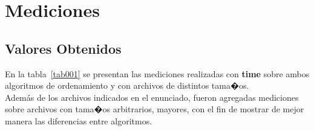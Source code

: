 \documentclass[a4paper,10pt]{article}
\begin{document}
\section{Mediciones}

\subsection{Valores Obtenidos}

En la tabla~\ref{tab001} se presentan las mediciones realizadas con \textbf{time} sobre ambos algoritmos de ordenamiento y con archivos de distintos tama�os.\\

Adem\'as de los archivos indicados en el enunciado, fueron agregadas mediciones sobre archivos con tama�os arbitrarios, mayores, con el fin de mostrar de mejor manera las diferencias entre algoritmos.
\end{document}
